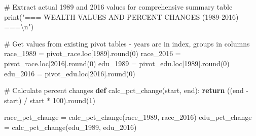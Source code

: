 \documentclass[
  letterpaper,
  DIV=11,
  numbers=noendperiod]{scrartcl}
\newenvironment{Shaded}{\begin{snugshade}}{\end{snugshade}}
\newcommand{\BuiltInTok}[1]{\textcolor[rgb]{0.00,0.23,0.31}{#1}}
\newcommand{\CharTok}[1]{\textcolor[rgb]{0.13,0.47,0.30}{#1}}
\newcommand{\CommentTok}[1]{\textcolor[rgb]{0.37,0.37,0.37}{#1}}
\newcommand{\ControlFlowTok}[1]{\textcolor[rgb]{0.00,0.23,0.31}{\textbf{#1}}}
\newcommand{\DecValTok}[1]{\textcolor[rgb]{0.68,0.00,0.00}{#1}}
\newcommand{\KeywordTok}[1]{\textcolor[rgb]{0.00,0.23,0.31}{\textbf{#1}}}
\newcommand{\NormalTok}[1]{\textcolor[rgb]{0.00,0.23,0.31}{#1}}
\newcommand{\OperatorTok}[1]{\textcolor[rgb]{0.37,0.37,0.37}{#1}}
\newcommand{\StringTok}[1]{\textcolor[rgb]{0.13,0.47,0.30}{#1}}
\begin{document}
\begin{Shaded}
\begin{Highlighting}[]
\CommentTok{\# Extract actual 1989 and 2016 values for comprehensive summary table}
\BuiltInTok{print}\NormalTok{(}\StringTok{"=== WEALTH VALUES AND PERCENT CHANGES (1989{-}2016) ===}\CharTok{\textbackslash{}n}\StringTok{"}\NormalTok{)}

\CommentTok{\# Get values from existing pivot tables {-} years are in index, groups in columns}
\NormalTok{race\_1989 }\OperatorTok{=}\NormalTok{ pivot\_race.loc[}\DecValTok{1989}\NormalTok{].}\BuiltInTok{round}\NormalTok{(}\DecValTok{0}\NormalTok{)}
\NormalTok{race\_2016 }\OperatorTok{=}\NormalTok{ pivot\_race.loc[}\DecValTok{2016}\NormalTok{].}\BuiltInTok{round}\NormalTok{(}\DecValTok{0}\NormalTok{)}
\NormalTok{edu\_1989 }\OperatorTok{=}\NormalTok{ pivot\_edu.loc[}\DecValTok{1989}\NormalTok{].}\BuiltInTok{round}\NormalTok{(}\DecValTok{0}\NormalTok{)}
\NormalTok{edu\_2016 }\OperatorTok{=}\NormalTok{ pivot\_edu.loc[}\DecValTok{2016}\NormalTok{].}\BuiltInTok{round}\NormalTok{(}\DecValTok{0}\NormalTok{)}

\CommentTok{\# Calculate percent changes}
\KeywordTok{def}\NormalTok{ calc\_pct\_change(start, end):}
    \ControlFlowTok{return}\NormalTok{ ((end }\OperatorTok{{-}}\NormalTok{ start) }\OperatorTok{/}\NormalTok{ start }\OperatorTok{*} \DecValTok{100}\NormalTok{).}\BuiltInTok{round}\NormalTok{(}\DecValTok{1}\NormalTok{)}

\NormalTok{race\_pct\_change }\OperatorTok{=}\NormalTok{ calc\_pct\_change(race\_1989, race\_2016)}
\NormalTok{edu\_pct\_change }\OperatorTok{=}\NormalTok{ calc\_pct\_change(edu\_1989, edu\_2016)}


\end{Highlighting}
\end{Shaded}
\end{document}
